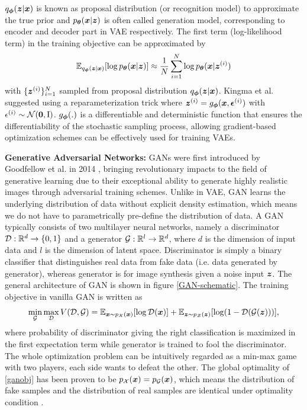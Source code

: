 $q_{\boldsymbol{\phi}}(\boldsymbol{z}|\boldsymbol{x})$ is known as proposal distribution (or recognition model) to approximate the true prior and $p_{\boldsymbol{\theta}}(\boldsymbol{x}|\boldsymbol{z})$ is often called generation model, corresponding to encoder and decoder part in VAE respectively. The first term (log-likelihood term) in the training objective can be approximated by 
\begin{equation}
    \mathbb{E}_{q_{\boldsymbol{\phi}}(\boldsymbol{z}|\boldsymbol{x})}[\log p_{\boldsymbol{\theta}}(\boldsymbol{x}|\boldsymbol{z})] \approx \frac{1}{N}\sum_{i=1}^{N}\log p_{\boldsymbol{\theta}}(\boldsymbol{x}|\boldsymbol{z}^{(i)})
\end{equation}
with $\{\boldsymbol{z}^{(i)}\}_{i=1}^{N}$ sampled from proposal distribution $q_{\boldsymbol{\phi}}(\boldsymbol{z}|\boldsymbol{x})$. Kingma et al. suggested using a reparameterization trick where $\boldsymbol{z}^{(i)} = g_{\boldsymbol{\phi}}(\boldsymbol{x},\boldsymbol{\epsilon}^{(i)})$ with ${\epsilon}^{(i)} \sim \mathcal{N}(\boldsymbol{0},\boldsymbol{\text{I}})$. $g_{\boldsymbol{\phi}}(.)$ is a differentiable and deterministic function that ensures the differentiability of the stochastic sampling process, allowing gradient-based optimization schemes can be effectively used for training VAEs. 


\noindent \textbf{Generative Adversarial Networks:} GANs were first introduced by Goodfellow et al. in 2014 \cite{goodfellowGenerativeAdversarialNets2014}, bringing revolutionary impacts to the field of generative learning due to their exceptional ability to generate highly realistic images through adversarial training schemes. Unlike in VAE, GAN learns the underlying distribution of data without explicit density estimation, which means we do not have to parametrically pre-define the distribution of data. A GAN typically consists of two multilayer neural networks, namely a discriminator $\mathcal{D}: \mathbb{R}^{d} \to \{0,1\}$ and a generator $\mathcal{G}: \mathbb{R}^{l} \to \mathbb{R}^{d}$, where $d$ is the dimension of input data and $l$ is the dimension of latent space. Discriminator is simply a binary classifier that distinguishes real data from fake data (i.e. data generated by generator), whereas generator is for image synthesis given a noise input $\boldsymbol{z}$. The general architecture of GAN is shown in figure \ref{GAN-schematic}. The training objective in vanilla GAN is written as 
\begin{equation}
    \min_{\mathcal{G}} \max_{\mathcal{D}} V(\mathcal{D}, \mathcal{G}) = \mathbb{E} _{\boldsymbol{x} \sim p_{\mathcal{X}}(\boldsymbol{x})}[\log \mathcal{D}(\boldsymbol{x})] + \mathbb{E}_{\boldsymbol{z} \sim p_{\mathcal{Z}}(\boldsymbol{z})}[\log(1-\mathcal{D}(\mathcal{G}(\boldsymbol{z})))],
    \label{ganobj}
\end{equation}
where probability of discriminator giving the right classification is maximized in the first expectation term while generator is trained to fool the discriminator. The whole optimization problem can be intuitively regarded as a min-max game with two players, each side wants to defeat the other. The global optimality of \ref{ganobj} has been proven to be $p_{\mathcal{X}}(\boldsymbol{x}) = p_{\mathcal{G}}(\boldsymbol{x})$, which means the distribution of fake samples and the distribution of real samples are identical under optimality condition \cite{goodfellowGenerativeAdversarialNets2014}.

